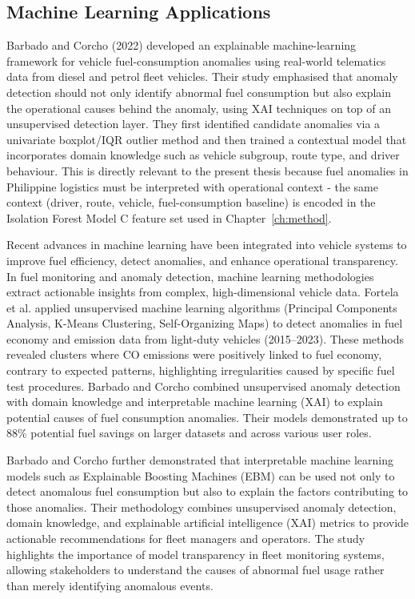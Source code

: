 \subsection{Machine Learning Applications}
\normalsize

Barbado and Corcho (2022) \cite{barbado2022interpretable} developed an explainable machine-learning framework for vehicle fuel-consumption anomalies using real-world telematics data from diesel and petrol fleet vehicles. Their study emphasised that anomaly detection should not only identify abnormal fuel consumption but also explain the operational causes behind the anomaly, using XAI techniques on top of an unsupervised detection layer. They first identified candidate anomalies via a univariate boxplot/IQR outlier method and then trained a contextual model that incorporates domain knowledge such as vehicle subgroup, route type, and driver behaviour. This is directly relevant to the present thesis because fuel anomalies in Philippine logistics must be interpreted with operational context - the same context (driver, route, vehicle, fuel-consumption baseline) is encoded in the Isolation Forest Model C feature set used in Chapter~\ref{ch:method}.

Recent advances in machine learning have been integrated into vehicle systems to improve fuel efficiency, detect anomalies, and enhance operational transparency. In fuel monitoring and anomaly detection, machine learning methodologies extract actionable insights from complex, high-dimensional vehicle data. Fortela et al. \cite{fortela2023unsupervised} applied unsupervised machine learning algorithms (Principal Components Analysis, K-Means Clustering, Self-Organizing Maps) to detect anomalies in fuel economy and emission data from light-duty vehicles (2015–2023). These methods revealed clusters where CO emissions were positively linked to fuel economy, contrary to expected patterns, highlighting irregularities caused by specific fuel test procedures. Barbado and Corcho \cite{barbado2022interpretable} combined unsupervised anomaly detection with domain knowledge and interpretable machine learning (XAI) to explain potential causes of fuel consumption anomalies. Their models demonstrated up to 88\% potential fuel savings on larger datasets and across various user roles.

Barbado and Corcho \cite{barbado2022interpretable} further demonstrated that interpretable machine learning models such as Explainable Boosting Machines (EBM) can be used not only to detect anomalous fuel consumption but also to explain the factors contributing to those anomalies. Their methodology combines unsupervised anomaly detection, domain knowledge, and explainable artificial intelligence (XAI) metrics to provide actionable recommendations for fleet managers and operators. The study highlights the importance of model transparency in fleet monitoring systems, allowing stakeholders to understand the causes of abnormal fuel usage rather than merely identifying anomalous events.

